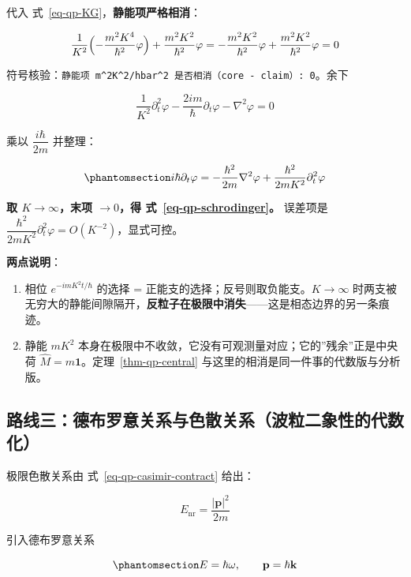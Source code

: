 \documentclass[
  chinese,
  a4paper,
  UTF8,
  12pt,
  oneside,
  openany]{ctexbook}
\providecommand{\tightlist}{%
  \setlength{\itemsep}{0pt}\setlength{\parskip}{0pt}}
\theoremstyle{plain}
\theoremstyle{plain}
\theoremstyle{plain}
\theoremstyle{definition}
\theoremstyle{plain}
\theoremstyle{plain}
\theoremstyle{remark}
\begin{document}
代入 式~\ref{eq-qp-KG}，\textbf{静能项严格相消}：

\[
\frac{1}{K^{2}}\Bigl(-\frac{m^{2}K^{4}}{\hbar^{2}}\varphi\Bigr)+\frac{m^{2}K^{2}}{\hbar^{2}}\varphi
=-\frac{m^{2}K^{2}}{\hbar^{2}}\varphi+\frac{m^{2}K^{2}}{\hbar^{2}}\varphi=0
\]

符号核验：\texttt{静能项\ m\^{}2K\^{}2/hbar\^{}2\ 是否相消（core\ -\ claim）:\ 0}。余下

\[
\frac{1}{K^{2}}\partial_t^{2}\varphi-\frac{2im}{\hbar}\partial_t\varphi-\nabla^{2}\varphi=0
\]

乘以 \(\dfrac{i\hbar}{2m}\) 并整理：

\begin{equation}\protect\phantomsection\label{eq-qp-preSch}{
i\hbar\partial_t\varphi=-\frac{\hbar^{2}}{2m}\nabla^{2}\varphi
+\frac{\hbar^{2}}{2mK^{2}}\partial_t^{2}\varphi
}\end{equation}

\textbf{取 \(K\to\infty\)，末项 \(\to0\)，得
式~\ref{eq-qp-schrodinger}。} 误差项是
\(\dfrac{\hbar^{2}}{2mK^{2}}\partial_t^{2}\varphi=O(K^{-2})\)，显式可控。

\textbf{两点说明}：

\begin{enumerate}
\def\labelenumi{\arabic{enumi}.}
\tightlist
\item
  相位 \(e^{-imK^{2}t/\hbar}\) 的选择 =
  正能支的选择；反号则取负能支。\(K\to\infty\)
  时两支被无穷大的静能间隙隔开，\textbf{反粒子在极限中消失}------这是相态边界的另一条痕迹。
\item
  静能 \(mK^{2}\)
  本身在极限中不收敛，它没有可观测量对应；它的''残余''正是中央荷
  \(\hat M=m\mathbf 1\)。定理~\ref{thm-qp-central}
  与这里的相消是同一件事的代数版与分析版。
\end{enumerate}

\subsection{路线三：德布罗意关系与色散关系（波粒二象性的代数化）}\label{ux8defux7ebfux4e09ux5fb7ux5e03ux7f57ux610fux5173ux7cfbux4e0eux8272ux6563ux5173ux7cfbux6ce2ux7c92ux4e8cux8c61ux6027ux7684ux4ee3ux6570ux5316}

极限色散关系由 式~\ref{eq-qp-casimir-contract} 给出：

\[
E_{\text{nr}}=\frac{\lvert\mathbf p\rvert^{2}}{2m}
\]

引入德布罗意关系

\begin{equation}\protect\phantomsection\label{eq-qp-debroglie}{
E=\hbar\omega,\qquad \mathbf p=\hbar\mathbf k
}\end{equation}
\end{document}
